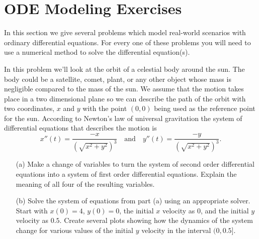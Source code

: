 \section{ODE Modeling Exercises}
In this section we give several problems which model real-world scenarios with ordinary
differential equations.  For every one of these problems you will need to use a numerical
method to solve the differential equation(s).

\begin{problem}
    In this problem we'll look at the orbit of a celestial body around the sun.  The body
    could be a satellite, comet, plant, or any other object whose mass is negligible
    compared to the mass of the sun.  We assume that the motion takes place in a two
    dimensional plane so we can describe the path of the orbit with two coordinates, $x$
    and $y$ with the point $(0,0)$ being used as the reference point for the sun.
    According to Newton's law of universal gravitation the system of differential
    equations that describes the motion is 
    \[ x''(t) = \frac{-x}{\left( \sqrt{x^2 + y^2} \right)^3} \quad \text{and} \quad y''(t)
    = \frac{-y}{\left( \sqrt{x^2 + y^2} \right)^3}. \]
    \begin{enumerate}
        \item[(a)] Make a change of variables to turn the system of second order
            differential equations into a system of first order differential equations.
            Explain the meaning of all four of the resulting variables.
        \item[(b)] Solve the system of equations from part (a) using an appropriate
            solver.  Start with $x(0) = 4$, $y(0) = 0$, the initial $x$ velocity as $0$,
            and the initial $y$ velocity as $0.5$.  Create several plots showing how the
            dynamics of the system change for various values of the initial $y$ velocity
        in the interval $(0,0.5]$.
    \end{enumerate}
\end{problem}

